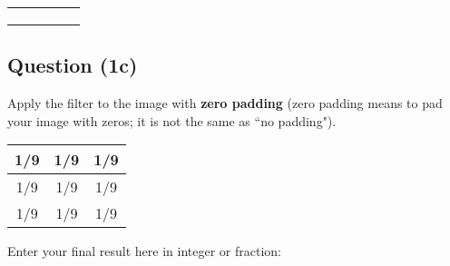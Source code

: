 \documentclass[12pt]{article}
\begin{document}
\begin{center}
\begin{tabular}{|l|l|l|l|l|}
\hline
\hspace{1mm} & \hspace{1mm} & \hspace{1mm} & \hspace{1mm} & \hspace{1mm} \\ \hline
\hspace{1mm} & \hspace{1mm} & \hspace{1mm} & \hspace{1mm} & \hspace{1mm} \\ \hline
\hspace{1mm} & \hspace{1mm} & \hspace{1mm} & \hspace{1mm} & \hspace{1mm} \\ \hline
\hspace{1mm} & \hspace{1mm} & \hspace{1mm} & \hspace{1mm} & \hspace{1mm} \\ \hline
\end{tabular}
\end{center}

\newpage

\subsection*{Question (1c)} Apply the filter to the image with \textbf{zero padding} (zero padding means to pad your image with zeros; it is not the same as ``no padding").
\begin{center}
\begin{tabular}{|c|c|c|}
\hline
1/9  & 1/9 & 1/9 \\ \hline
1/9  & 1/9 & 1/9 \\ \hline
1/9  & 1/9 & 1/9 \\ \hline
\end{tabular}
\end{center}

\noindent Enter your final result here in integer or fraction:
\end{document}
